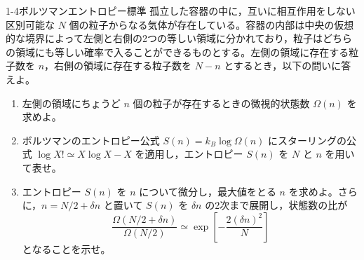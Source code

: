 
\begin{mondai}{1-4}{ボルツマンエントロピー}{標準}
孤立した容器の中に，互いに相互作用をしない区別可能な $N$ 個の粒子からなる気体が存在している。容器の内部は中央の仮想的な境界によって左側と右側の2つの等しい領域に分かれており，粒子はどちらの領域にも等しい確率で入ることができるものとする。左側の領域に存在する粒子数を $n$，右側の領域に存在する粒子数を $N-n$ とするとき，以下の問いに答えよ。

\begin{enumerate}
  \item 左側の領域にちょうど $n$ 個の粒子が存在するときの微視的状態数 $\Omega(n)$ を求めよ。

  \item ボルツマンのエントロピー公式 $S(n) = k_B \log \Omega(n)$ にスターリングの公式 $\log X! \simeq X \log X - X$ を適用し，エントロピー $S(n)$ を $N$ と $n$ を用いて表せ。

  \item エントロピー $S(n)$ を $n$ について微分し，最大値をとる $n$ を求めよ。さらに，$n=N/2+\delta n$ と置いて $S(n)$ を $\delta n$ の2次まで展開し，状態数の比が
  \begin{equation*}
  \frac{\Omega(N/2+\delta n)}{\Omega(N/2)} \simeq \exp\left[-\frac{2(\delta n)^2}{N}\right]
  \end{equation*}
  となることを示せ。
\end{enumerate}
\end{mondai}

